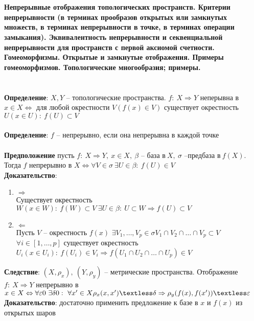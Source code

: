 \section{}
	\textbf{Непрерывные отображения топологических пространств. Критерии непрерывности (в терминах прообразов открытых или замкнутых множеств, в терминах непрерывности в точке, в терминах операции замыкания). Эквивалентность непрерывности и секвенциальной непрерывности для пространств с первой аксиомой счетности. Гомеоморфизмы. Открытые и замкнутые отображения. Примеры гомеоморфизмов. Топологические многообразия; примеры.}\\
	\\
	\\
	\textbf{Определение}: $X, Y$ -- топологические пространства. $f:\ X \Rightarrow Y$ неперывна в $x \in X \Leftrightarrow$ для любой окрестности $V (f(x)\in V)$ существует окрестность $U(x\in U):\ f(U) \subset V$\\
	\\
	\textbf{Определение}: $f$ -- непрерывно, если она непрерывна в каждой точке\\
	\\
	\textbf{Предположение} пусть $f:\ X \Rightarrow Y,\ x\in X,\ \beta \text{ -- база в}\ X,\ \sigma \text{ --предбаза в}\ f(X)$. Тогда $f$ непрерывно в $X \Leftrightarrow \forall V \in \sigma\ \exists U \in \beta:\ f(U) \in V$\\
	\textbf{Доказательство}: 
	\begin{enumerate}
		\item 
		$\Rightarrow$\\
		Существует окрестность $W(x\in W):\ f(W) \subset V\ \exists U\in \beta:\ U \subset W \Rightarrow f(U) \subset V$
		\item 
		$\Leftarrow$\\
		Пусть $V$ -- окрестность $f(x)$
		$\exists V_1,\ldots , V_p \in \sigma V_1 \cap V_2 \cap \ldots \cap V_p \subset V\ $\\
		$\forall i \in [1, \ldots , p]$ существует окрестность $U_i (x \in U_i):\ f(U_i) \in V_i \Rightarrow f(U_1 \cap U_2 \cap \ldots \cap U_p)\in V$
	\end{enumerate}
	\textbf{Следствие}: $(X, {\rho}_x),\ (Y, {\rho}_y)$ -- метрические пространства. Отображение $f:\ X\Rightarrow Y$ непрерывно в $x \in X \Leftrightarrow \forall \varepsilon 0\ \exists \delta 0:\ \forall x^{\prime} \in X {\rho}_x (x,x^{\prime}) \textless \delta \Rightarrow {\rho}_y (f(x),f(x^{\prime}))\textless \varepsilon$\\
	\textbf{Доказательство}: достаточно применить предложение к базе в $x$ и $f(x)$ из открытых шаров\\
